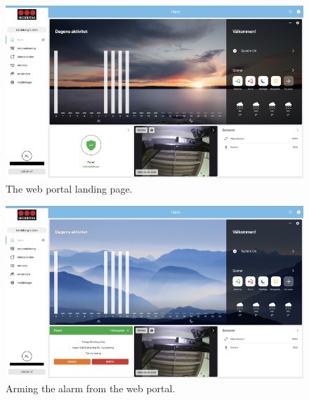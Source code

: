 \begin{figure}[!ht]
    \centering
    \includegraphics[width=\textwidth]{images/landing-page-web.png}
    \caption{The web portal landing page.}
    \label{fig:web-landing-page}
\end{figure}
\begin{figure}[!ht]
    \centering
    \includegraphics[width=\textwidth]{images/arming-web.png}
    \caption{Arming the alarm from the web portal.}
    \label{fig:web-arming}
\end{figure}

